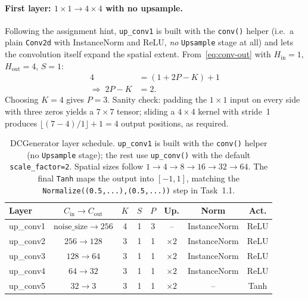 \documentclass[11pt,a4paper]{article}
\begin{document}
\paragraph{First layer: $1\!\times\!1 \to 4\!\times\!4$ with no upsample.}
Following the assignment hint, \verb|up_conv1| is built with the
\verb|conv()| helper (i.e.\ a plain \verb|Conv2d| with InstanceNorm and
ReLU, \emph{no} \verb|Upsample| stage at all) and lets the convolution
itself expand the spatial extent. From~\eqref{eq:conv-out} with
$H_{\text{in}}=1$, $H_{\text{out}}=4$, $S=1$:
\begin{align*}
    4 &= (1 + 2P - K) + 1 \\[2pt]
    \Rightarrow\; 2P - K &= 2.
\end{align*}
Choosing $K=4$ gives $\boxed{P=3}$. Sanity check: padding the
$1\!\times\!1$ input on every side with three zeros yields a
$7\!\times\!7$ tensor; sliding a $4\!\times\!4$ kernel with stride~1
produces $\lfloor (7-4)/1 \rfloor + 1 = 4$ output positions, as required.

\begin{table}[h]
    \centering
    \begin{tabular}{lccccccc}
        \toprule
        Layer & $C_{\text{in}}\!\to\!C_{\text{out}}$ & $K$ & $S$ & $P$ & Up. & Norm & Act. \\
        \midrule
        up\_conv1 & $\text{noise\_size} \to 256$ & 4 & 1 & 3 & --        & InstanceNorm & ReLU \\
        up\_conv2 & $256 \to 128$                & 3 & 1 & 1 & $\times 2$ & InstanceNorm & ReLU \\
        up\_conv3 & $128 \to 64$                 & 3 & 1 & 1 & $\times 2$ & InstanceNorm & ReLU \\
        up\_conv4 & $64  \to 32$                 & 3 & 1 & 1 & $\times 2$ & InstanceNorm & ReLU \\
        up\_conv5 & $32  \to 3$                  & 3 & 1 & 1 & $\times 2$ & --           & Tanh \\
        \bottomrule
    \end{tabular}
    \caption{DCGenerator layer schedule. \texttt{up\_conv1} is built with
             the \texttt{conv()} helper (no \texttt{Upsample} stage);
             the rest use \texttt{up\_conv()} with the default
             \texttt{scale\_factor=2}. Spatial sizes follow
             $1 \to 4 \to 8 \to 16 \to 32 \to 64$. The final
             \texttt{Tanh} maps the output into $[-1,1]$, matching the
             \texttt{Normalize((0.5,...),(0.5,...))} step in Task~1.1.}
    \label{tab:gen}
\end{table}
\end{document}
